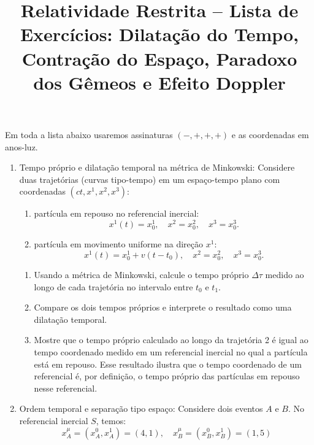 \newif\ifuseseminar
\useseminartrue


\title{Relatividade Restrita -- Lista de Exercícios: Dilatação do Tempo, Contração do Espaço, Paradoxo dos Gêmeos e Efeito Doppler}



Em toda a lista abaixo usaremos assinaturas $(-,+,+,+)$ e as coordenadas em anos-luz.

\begin{enumerate}

      \item Tempo próprio e dilatação temporal na métrica de Minkowski: Considere duas
            trajetórias (curvas tipo-tempo) em um espaço-tempo plano com coordenadas
            $(ct, x^1, x^2, x^3)$:

            \begin{enumerate}
                  \item[Trajetória 1] partícula em repouso no referencial inercial:
                        $$x^1(t) = x^1_0,\quad x^2 = x^2_0,\quad x^3 = x^3_0.$$

                  \item[Trajetória 2] partícula em movimento uniforme na direção $x^1$:
                        $$x^1(t) = x^1_0 + v(t - t_0),\quad x^2 = x^2_0, \quad x^3 = x^3_0.$$
            \end{enumerate}

            \begin{enumerate}
                  \item Usando a métrica de Minkowski, calcule o tempo próprio
                        $\Delta \tau$ medido ao longo de cada trajetória no intervalo entre
                        $t_0$ e $t_1$.
                  \item Compare os dois tempos próprios e interprete o resultado como
                        uma dilatação temporal.
                  \item Mostre que o tempo próprio calculado ao longo da trajetória 2 é
                        igual ao tempo coordenado medido em um referencial inercial no qual a
                        partícula está em repouso. Esse resultado ilustra que o tempo
                        coordenado de um referencial é, por definição, o tempo próprio das
                        partículas em repouso nesse referencial.
            \end{enumerate}


      \item Ordem temporal e separação tipo espaço: Considere dois eventos $A$ e $B$. No
            referencial inercial $S$, temos:
            $$
                  x_A^\mu = (x^0_A, x^1_A) = (4, 1), \quad
                  x_B^\mu = (x^0_B, x^1_B) = (1, 5)
            $$


\end{enumerate}
